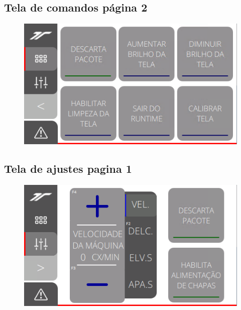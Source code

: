\newpage
\thispagestyle{fancy}
\vspace*{\fill}
\subsection{\small{Tela de comandos página 2}}
\begin{figure}[h]
  \centering
  \includegraphics{src/imagesFlexo/12-IHMCNT/e-3.png}
\end{figure}
\vspace*{\fill}

\newpage
\thispagestyle{fancy}
\vspace*{\fill}
\subsection{\small{Tela de ajustes pagina 1}}
\begin{figure}[h]
  \centering
  \includegraphics{src/imagesFlexo/12-IHMCNT/e-4.png}
\end{figure}
\vspace*{\fill}

\newpage
\thispagestyle{fancy}
\vspace*{\fill}

